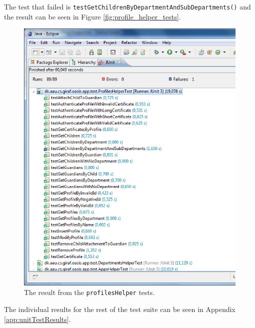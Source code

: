 The test that failed is \texttt{testGetChildrenByDepartmentAndSubDepartments()} and the result can be seen in Figure \vref{fig:profile_helper_tests}.

\begin{figure}[htbp]
	\centering
		\includegraphics[width=\textwidth]{Images/unit_testing/profile_helper_tests.PNG}
	\caption{The result from the \texttt{profilesHelper} tests.}
	\label{fig:profile_helper_tests}
\end{figure}

The individual results for the rest of the test suite can be seen in Appendix \vref{app:unitTestResults}.